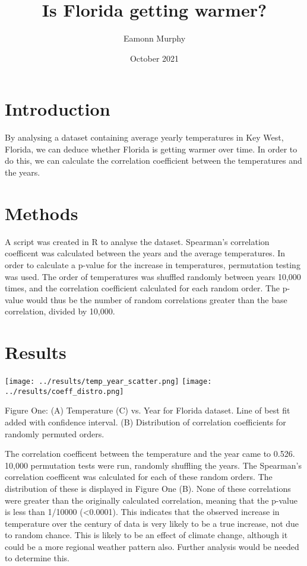\documentclass[10pt]{article}
\title{Is Florida getting warmer?}
\author{Eamonn Murphy}
\date{October 2021}
\begin{document}
\maketitle

\thispagestyle{empty}

\section{Introduction}
By analysing a dataset containing average yearly temperatures in Key West, 
Florida, we can deduce whether Florida is getting warmer over time. In order to 
do this, we can calculate the correlation coefficient between the temperatures 
and the years.

\section{Methods}
A script was created in R to analyse the dataset. Spearman's correlation 
coefficent was calculated between the years and the average temperatures. In 
order to calculate a p-value for the increase in temperatures, permutation testing was used. The order of temperatures was shuffled randomly between years 10,000  times, and the correlation coefficient calculated for each random order. The p-value would thus be the number of random correlations greater than the base correlation, divided by 10,000.

\section{Results}
\begin{center}
    \texttt{[image: ../results/temp\_year\_scatter.png]}
    \texttt{[image: ../results/coeff\_distro.png]}

    Figure One: (A) Temperature (C) vs. Year for Florida dataset. Line of best fit
    added with confidence interval. (B) Distribution of correlation coefficients
    for randomly permuted orders.
\end{center}

The correlation coefficent between the temperature and the year came to 0.526.
10,000 permutation tests were run, randomly shuffling the years. The Spearman's
correlation coefficent was calculated for each of these random orders. The
distribution of these is displayed in Figure One (B). None of these correlations 
were greater than the originally calculated correlation, meaning that the p-value 
is less than 1/10000 (<0.0001). This indicates that the observed increase in 
temperature over the century of data is very likely to be a true increase, not 
due to random chance. This is likely to be an effect of climate change, although
it could be a more regional weather pattern also. Further analysis would be needed 
to determine this.
\end{document}
